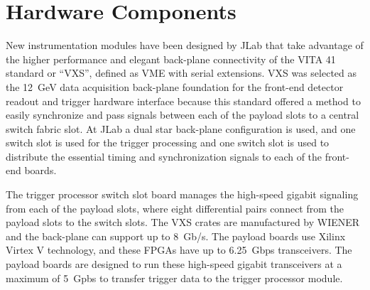 \section{Hardware Components}

New instrumentation modules have been designed by JLab that take advantage of the higher performance and elegant back-plane connectivity of the VITA 41 standard or ``VXS'', defined as VME with serial extensions. 
VXS was selected as the 12~GeV data acquisition back-plane foundation for the front-end detector readout and trigger hardware interface because this standard offered a method to easily synchronize and pass signals between each of the payload slots to a central switch fabric slot. At JLab a dual star back-plane configuration is used, and one switch slot is used for the trigger processing and one switch slot is used to distribute the essential timing and synchronization signals to each of the front-end boards.

The trigger processor switch slot board manages the high-speed gigabit signaling from each of the payload slots, where eight differential pairs connect from the payload slots to the switch slots. The VXS crates are manufactured by WIENER and the back-plane can support up to 8~Gb/s. The payload boards use Xilinx Virtex V technology, and these FPGAs have up to 6.25~Gbps transceivers. The payload boards are designed to run these high-speed gigabit transceivers at a maximum of 5~Gpbs to transfer trigger data to the trigger processor module. 


